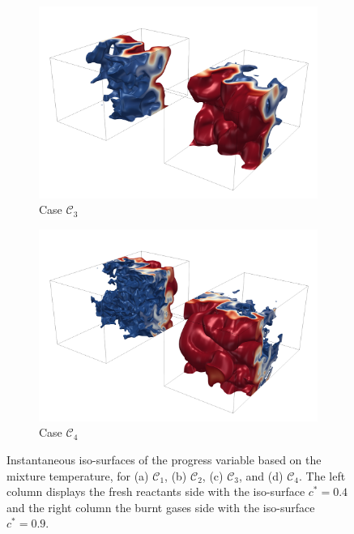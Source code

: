 \documentclass[review,times,sort&compress]{elsarticle}
\begin{document}
\begin{figure}[htpb]
\begin{subfigure}{.48\textwidth}
\centering
\includegraphics[width=.99\textwidth]{./figs/progvar/case3.pdf}
\caption{Case $\mathcal{C}_3$}
\label{fig:progvar_contour_case3}
\end{subfigure}
%
\begin{subfigure}{.48\textwidth}
\centering
\includegraphics[width=.99\textwidth]{./figs/progvar/case4.pdf}
\caption{Case $\mathcal{C}_4$}
\label{fig:progvar_contour_case4}
\end{subfigure}
\caption{Instantaneous iso-surfaces of the progress variable based on the mixture temperature,
for (a) $\mathcal{C}_1$, (b) $\mathcal{C}_2$, (c) $\mathcal{C}_3$, and (d) $\mathcal{C}_4$.
%
The left column displays the fresh reactants side with the iso-surface $c^*=0.4$ and the right column
the burnt gases side with the iso-surface $c^*=0.9$.}
\label{fig:snapshots_prog_var}
\end{figure}
\end{document}
